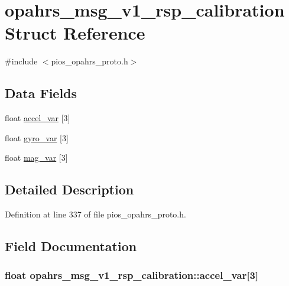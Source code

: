 \hypertarget{structopahrs__msg__v1__rsp__calibration}{\section{opahrs\-\_\-msg\-\_\-v1\-\_\-rsp\-\_\-calibration Struct Reference}
\label{structopahrs__msg__v1__rsp__calibration}
}


{\ttfamily \#include $<$pios\-\_\-opahrs\-\_\-proto.\-h$>$}

\subsection*{Data Fields}
\begin{DoxyCompactItemize}
\item 
float \hyperlink{structopahrs__msg__v1__rsp__calibration_a5cd3500e3bc814d7877b9bb9747796af}{accel\-\_\-var} \mbox{[}3\mbox{]}
\item 
float \hyperlink{structopahrs__msg__v1__rsp__calibration_a1e3d6cc79fdc776ec0f703bf06ae0a39}{gyro\-\_\-var} \mbox{[}3\mbox{]}
\item 
float \hyperlink{structopahrs__msg__v1__rsp__calibration_a5965d2b03e83b6a971450889ba47d4dd}{mag\-\_\-var} \mbox{[}3\mbox{]}
\end{DoxyCompactItemize}


\subsection{Detailed Description}


Definition at line 337 of file pios\-\_\-opahrs\-\_\-proto.\-h.



\subsection{Field Documentation}
\hypertarget{structopahrs__msg__v1__rsp__calibration_a5cd3500e3bc814d7877b9bb9747796af}{
\subsubsection[{accel\-\_\-var}]{\setlength{\rightskip}{0pt plus 5cm}float opahrs\-\_\-msg\-\_\-v1\-\_\-rsp\-\_\-calibration\-::accel\-\_\-var\mbox{[}3\mbox{]}}}\label{structopahrs__msg__v1__rsp__calibration_a5cd3500e3bc814d7877b9bb9747796af}


